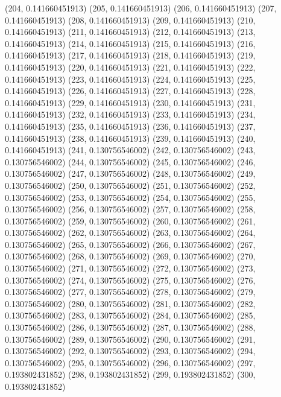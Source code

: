 {					(204, 0.141660451913)
					(205, 0.141660451913)
					(206, 0.141660451913)
					(207, 0.141660451913)
					(208, 0.141660451913)
					(209, 0.141660451913)
					(210, 0.141660451913)
					(211, 0.141660451913)
					(212, 0.141660451913)
					(213, 0.141660451913)
					(214, 0.141660451913)
					(215, 0.141660451913)
					(216, 0.141660451913)
					(217, 0.141660451913)
					(218, 0.141660451913)
					(219, 0.141660451913)
					(220, 0.141660451913)
					(221, 0.141660451913)
					(222, 0.141660451913)
					(223, 0.141660451913)
					(224, 0.141660451913)
					(225, 0.141660451913)
					(226, 0.141660451913)
					(227, 0.141660451913)
					(228, 0.141660451913)
					(229, 0.141660451913)
					(230, 0.141660451913)
					(231, 0.141660451913)
					(232, 0.141660451913)
					(233, 0.141660451913)
					(234, 0.141660451913)
					(235, 0.141660451913)
					(236, 0.141660451913)
					(237, 0.141660451913)
					(238, 0.141660451913)
					(239, 0.141660451913)
					(240, 0.141660451913)
					(241, 0.130756546002)
					(242, 0.130756546002)
					(243, 0.130756546002)
					(244, 0.130756546002)
					(245, 0.130756546002)
					(246, 0.130756546002)
					(247, 0.130756546002)
					(248, 0.130756546002)
					(249, 0.130756546002)
					(250, 0.130756546002)
					(251, 0.130756546002)
					(252, 0.130756546002)
					(253, 0.130756546002)
					(254, 0.130756546002)
					(255, 0.130756546002)
					(256, 0.130756546002)
					(257, 0.130756546002)
					(258, 0.130756546002)
					(259, 0.130756546002)
					(260, 0.130756546002)
					(261, 0.130756546002)
					(262, 0.130756546002)
					(263, 0.130756546002)
					(264, 0.130756546002)
					(265, 0.130756546002)
					(266, 0.130756546002)
					(267, 0.130756546002)
					(268, 0.130756546002)
					(269, 0.130756546002)
					(270, 0.130756546002)
					(271, 0.130756546002)
					(272, 0.130756546002)
					(273, 0.130756546002)
					(274, 0.130756546002)
					(275, 0.130756546002)
					(276, 0.130756546002)
					(277, 0.130756546002)
					(278, 0.130756546002)
					(279, 0.130756546002)
					(280, 0.130756546002)
					(281, 0.130756546002)
					(282, 0.130756546002)
					(283, 0.130756546002)
					(284, 0.130756546002)
					(285, 0.130756546002)
					(286, 0.130756546002)
					(287, 0.130756546002)
					(288, 0.130756546002)
					(289, 0.130756546002)
					(290, 0.130756546002)
					(291, 0.130756546002)
					(292, 0.130756546002)
					(293, 0.130756546002)
					(294, 0.130756546002)
					(295, 0.130756546002)
					(296, 0.130756546002)
					(297, 0.193802431852)
					(298, 0.193802431852)
					(299, 0.193802431852)
					(300, 0.193802431852)
}

